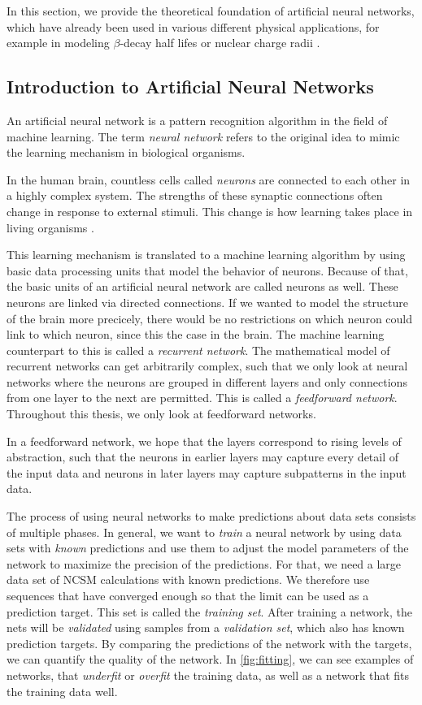 In this section, we provide the theoretical foundation of artificial neural networks, which have already been used in various different physical
applications, for example in modeling $\beta$-decay half lifes \cite{nnbetadecay} or nuclear charge radii \cite{Akkoyun_2013}.

\subsection{Introduction to Artificial Neural Networks}

An artificial neural network is a pattern recognition algorithm in the field of machine learning. The term \textit{neural network} refers to the original idea to mimic the learning mechanism in biological organisms.

In the human brain, countless cells called \textit{neurons} are connected to each other in a highly complex system. The strengths of these synaptic connections often change in response to external stimuli. This change is how learning takes place in living organisms \cite{Aggarwal2018}.

This learning mechanism is translated to a machine learning algorithm by using basic data processing units that model the behavior of neurons. Because of that, the basic units of an artificial neural network are called neurons as well. These neurons are linked via directed connections. If we wanted to model the structure of the brain more precicely, there would be no restrictions on which neuron could link to which neuron, since this the case in the brain. The machine learning counterpart to this is called a \textit{recurrent network}. The mathematical model of recurrent networks can get arbitrarily complex, such that we only look at neural networks where the neurons are grouped in different layers and only connections from one layer to the next are permitted. This is called a \textit{feedforward network}. Throughout this thesis, we only look at feedforward networks.

In a feedforward network, we hope that the layers correspond to rising levels of abstraction, such that the neurons in earlier layers may capture every detail of the input data and neurons in later layers may capture subpatterns in the input data.

The process of using neural networks to make predictions about data sets consists of multiple phases.
In general, we want to \textit{train} a neural network by using data sets with \textit{known} predictions and use them to adjust the model parameters of the network to maximize the precision of the predictions. For that, we need a large data set of NCSM calculations with known predictions. We therefore use sequences that have converged enough so that the limit can be used as a prediction target. This set is called the \textit{training set}.
After training a network, the nets will be \textit{validated} using samples from a \textit{validation set}, which also has known prediction targets. By comparing the predictions of the network with the targets, we can quantify the quality of the network. In \autoref{fig:fitting}, we can see examples of networks, that \textit{underfit} or \textit{overfit} the training data, as well as a network that fits the training data well.

